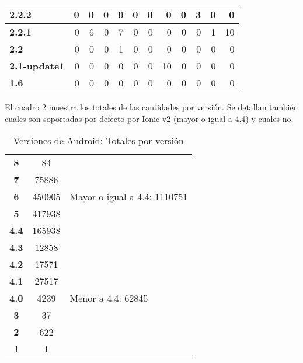 \begin{table}[htbp]
{\begin{tabular}{|l|r|r|r|r|r|r|r|r|r|r|r|}
\textbf{2.2.2} & 0 & 0 & 0 & 0 & 0 & 0 & 0 & 0 & 3 & 0 & 0 \\ \hline
\textbf{2.2.1} & 0 & 6 & 0 & 7 & 0 & 0 & 0 & 0 & 0 & 1 & 10 \\ \hline
\textbf{2.2} & 0 & 0 & 0 & 1 & 0 & 0 & 0 & 0 & 0 & 0 & 0 \\ \hline
\textbf{2.1-update1} & 0 & 0 & 0 & 0 & 0 & 0 & 10 & 0 & 0 & 0 & 0 \\ \hline
\textbf{1.6} & 0 & 0 & 0 & 0 & 0 & 0 & 0 & 0 & 0 & 0 & 0 \\ \hline
\end{tabular} }
\label{cantidad_versiones_android_p_2}
\end{table}

El cuadro \ref{cantidad_versiones_android_totales} muestra los totales de las cantidades por versión. Se detallan también cuales son soportadas por defecto por Ionic v2 (mayor o igual a 4.4) y cuales no.

\begin{table}[htbp]
\caption{Versiones de Android: Totales por versión}
\centering
\begin{tabular}{|c|c|l|}
\hline
\textbf{8} & 84 & \multirow{5}{*}{Mayor o igual a 4.4: 1110751} \\ 
\textbf{7} & 75886 &  \\ 
\textbf{6} & 450905 &  \\ 
\textbf{5} & 417938 &  \\ 
\textbf{4.4} & 165938 &  \\ \hline
\textbf{4.3} & 12858 & \multirow{7}{*}{Menor a 4.4: 62845} \\ 
\textbf{4.2} & 17571 &  \\ 
\textbf{4.1} & 27517 &  \\ 
\textbf{4.0} & 4239 &  \\ 
\textbf{3} & 37 &  \\ 
\textbf{2} & 622 &  \\ 
\textbf{1} & 1 &  \\ \hline
\end{tabular}
\label{cantidad_versiones_android_totales}
\end{table}
